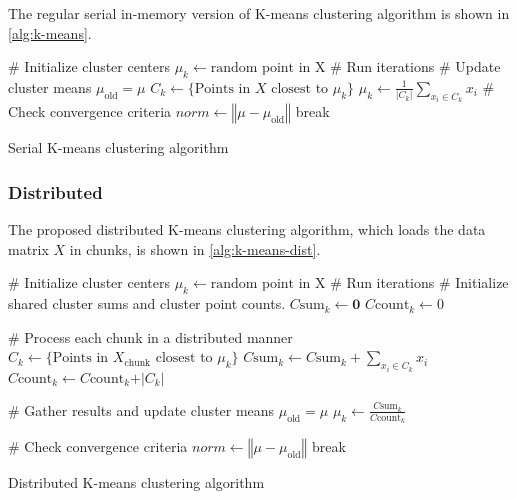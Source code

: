 The regular serial in-memory version of K-means clustering algorithm is shown in
\cref{alg:k-means}.
\begin{algorithm}[H]
  \begin{algorithmic}[1]
    \State \# Initialize cluster centers
      \State $\mu_k \gets \text{random point in X}$
    \EndFor
    \State \# Run iterations
      \State \# Update cluster means
      \State $\mu_\text{old} = \mu$
        \State $C_k \gets \{\text{Points in }X\text{ closest to }\mu_k\}$
        \State $\mu_k \gets \frac{1}{\vert C_k \vert} \sum_{x_i \in C_k} x_i$
      \EndFor
      \State \# Check convergence criteria
      \State $norm \gets \left\Vert \mu - \mu_\text{old} \right\Vert$
        \State break
      \EndIf
    \EndWhile
  \end{algorithmic}
  \caption{Serial K-means clustering algorithm}
  \label{alg:k-means}
\end{algorithm}

\subsubsection{Distributed}

The proposed distributed K-means clustering algorithm, which loads the data matrix
$X$ in chunks, is shown in \cref{alg:k-means-dist}.
\begin{algorithm}[H]
  \begin{algorithmic}[1]
    \State \# Initialize cluster centers
      \State $\mu_k \gets \text{random point in X}$
    \EndFor
    \State \# Run iterations
      \State \# Initialize shared cluster sums and cluster point counts.
        \State $C\text{sum}_k \gets \mathbf{0}$
        \State $C\text{count}_k \gets 0$
      \EndFor

      \State \# Process each chunk in a distributed manner
          \State $C_k \gets \{\text{Points in }X_\text{chunk}\text{ closest to }\mu_k\}$
          \State $C\text{sum}_k \gets C\text{sum}_k + \sum_{x_i \in C_k} x_i$
          \State $C\text{count}_k \gets C\text{count}_k + \vert C_k \vert$
        \EndFor
      \EndFor

      \State \# Gather results and update cluster means
      \State $\mu_\text{old} = \mu$
        \State $\mu_k \gets \frac{C\text{sum}_k}{C\text{count}_k}$
      \EndFor

      \State \# Check convergence criteria
      \State $norm \gets \left\Vert \mu - \mu_\text{old} \right\Vert$
        \State break
      \EndIf
    \EndWhile
  \end{algorithmic}
  \caption{Distributed K-means clustering algorithm}
  \label{alg:k-means-dist}
\end{algorithm}

